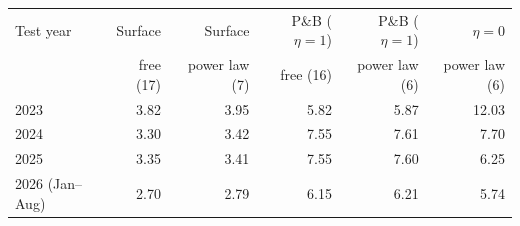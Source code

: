 \begin{tabular}{lrrrrr}
\toprule
Test year & Surface & Surface & P\&B (\(\eta=1\)) & P\&B (\(\eta=1\)) & \(\eta=0\) \\
 & free (17) & power law (7) & free (16) & power law (6) & power law (6) \\
\midrule
2023 & 3.82 & 3.95 & 5.82 & 5.87 & 12.03 \\
2024 & 3.30 & 3.42 & 7.55 & 7.61 & 7.70 \\
2025 & 3.35 & 3.41 & 7.55 & 7.60 & 6.25 \\
2026 (Jan--Aug) & 2.70 & 2.79 & 6.15 & 6.21 & 5.74 \\
\bottomrule
\end{tabular}
